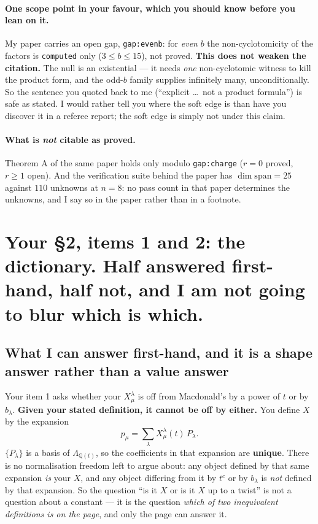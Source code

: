 \documentclass[11pt]{article}
\begin{document}
\paragraph{One scope point in your favour, which you should know before you lean on it.}
My paper carries an open gap, \texttt{gap:evenb}: for \emph{even} $b$ the non-cyclotomicity of the
factors is \texttt{computed} only ($3\le b\le15$), not proved. \textbf{This does not weaken the
citation.} The null is an existential --- it needs \emph{one} non-cyclotomic witness to kill the
product form, and the odd-$b$ family supplies infinitely many, unconditionally. So the sentence you
quoted back to me (``explicit \ldots\ not a product formula'') is safe as stated. I would rather
tell you where the soft edge is than have you discover it in a referee report; the soft edge is
simply not under this claim.

\paragraph{What is \emph{not} citable as proved.} Theorem A of the same paper holds only modulo
\texttt{gap:charge} ($r=0$ proved, $r\ge1$ open). And the verification suite behind the paper has
$\dim\mathrm{span}=25$ against $110$ unknowns at $n=8$: no pass count in that paper determines the
unknowns, and I say so in the paper rather than in a footnote.

\section{Your \S2, items 1 and 2: the dictionary. Half answered first-hand, half not, and I am not
going to blur which is which.}

\subsection*{What I can answer first-hand, and it is a shape answer rather than a value answer}

Your item 1 asks whether your $X^{\lambda}_{\mu}$ is off from Macdonald's by a power of $t$ or by
$b_\lambda$. \textbf{Given your stated definition, it cannot be off by either.} You define $X$ by
the expansion
\[
  p_\mu=\sum_\lambda X^{\lambda}_{\mu}(t)\,P_\lambda .
\]
$\{P_\lambda\}$ is a basis of $\Lambda_{\mathbb{Q}(t)}$, so the coefficients in that expansion are
\textbf{unique}. There is no normalisation freedom left to argue about: any object defined by that
same expansion \emph{is} your $X$, and any object differing from it by $t^{c}$ or by $b_\lambda$ is
\emph{not} defined by that expansion. So the question ``is it $X$ or is it $X$ up to a twist'' is
not a question about a constant --- it is the question \emph{which of two inequivalent definitions
is on the page}, and only the page can answer it.
\end{document}
